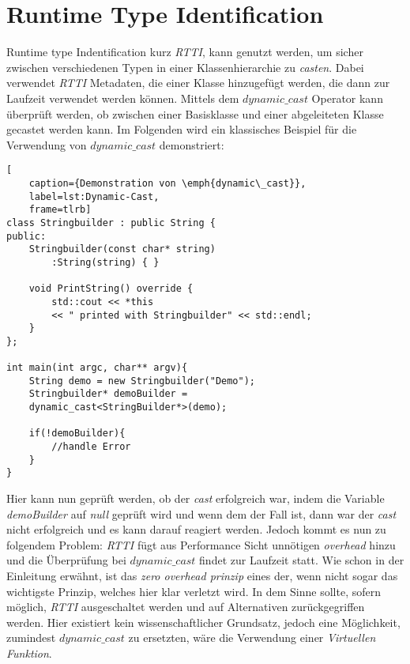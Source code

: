\section{Runtime Type Identification}\label{sec:rtti}
Runtime type Indentification kurz \emph{RTTI}, kann genutzt werden, um sicher zwischen
verschiedenen Typen in einer Klassenhierarchie zu \emph{casten}. Dabei verwendet \emph{RTTI}
Metadaten, die einer Klasse hinzugefügt werden, die dann zur Laufzeit verwendet werden können.
Mittels dem \emph{$dynamic\_cast$} Operator kann überprüft werden, ob zwischen einer Basisklasse
und einer abgeleiteten Klasse gecastet werden kann. Im Folgenden wird ein klassisches Beispiel
für die Verwendung von \emph{$dynamic\_cast$} demonstriert:
\begin{lstlisting}[
    caption={Demonstration von \emph{dynamic\_cast}},
    label=lst:Dynamic-Cast,
    frame=tlrb]
class Stringbuilder : public String {
public:
	Stringbuilder(const char* string)
		:String(string) { }

    void PrintString() override {
    	std::cout << *this
       	<< " printed with Stringbuilder" << std::endl;
    }
};

int main(int argc, char** argv){
	String demo = new Stringbuilder("Demo");
	Stringbuilder* demoBuilder =
	dynamic_cast<StringBuilder*>(demo);

	if(!demoBuilder){
		//handle Error
	}
}
\end{lstlisting}

Hier kann nun geprüft werden, ob der \emph{cast} erfolgreich war, indem die Variable
\emph{demoBuilder} auf \emph{null} geprüft wird und wenn dem der Fall ist, dann war der
\emph{cast} nicht erfolgreich und es kann darauf reagiert werden.
\newline
\newline
Jedoch kommt es nun zu folgendem Problem: \emph{RTTI} fügt aus Performance Sicht unnötigen
\emph{overhead} hinzu und die Überprüfung bei \emph{$dynamic\_cast$} findet zur Laufzeit statt.
Wie schon in der Einleitung erwähnt, ist das \emph{zero overhead prinzip} eines der, wenn nicht
sogar das wichtigste Prinzip, welches hier klar verletzt wird. In dem Sinne sollte, sofern
möglich, \emph{RTTI} ausgeschaltet werden und auf Alternativen zurückgegriffen werden. Hier
existiert kein wissenschaftlicher Grundsatz, jedoch eine Möglichkeit, zumindest
\emph{$dynamic\_cast$} zu ersetzten, wäre die Verwendung einer \emph{Virtuellen Funktion}.